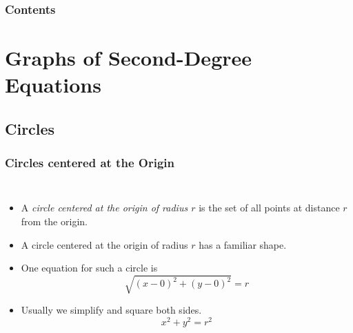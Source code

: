\documentclass[serif,ignorenonframetext]{beamer}
\title{\commonTitleZeroZeroC}
\subtitle{\commonSubtitleZeroZeroC}
\author{\commonAuthor}
\institute{\commonInstitute}
\date{\commonDateZeroZeroC}
\begin{document}

\begin{frame}
  \titlepage
\end{frame}

\begin{frame}
  \frametitle{Contents}
  \tableofcontents
\end{frame}


\section{Graphs of Second-Degree Equations}

\subsection{Circles}

\begin{frame}
  \frametitle{Circles centered at the Origin}
  \begin{columns}
  \begin{itemize}[<+->]
  \item A \textit{circle centered at the origin of radius $r$} is the
    set of all points at distance $r$ from the origin.
  \item A circle centered at the origin of radius $r$ has a familiar
    shape.
  \item One equation for such a circle is
    \begin{equation*}
      \sqrt{(x-0)^2+(y-0)^2} = r
    \end{equation*}
  \item Usually we simplify and square both sides.
    \begin{equation*}
      x^2+y^2=r^2
    \end{equation*}
  \end{itemize}
  \end{columns}
\end{frame}
\end{document}
